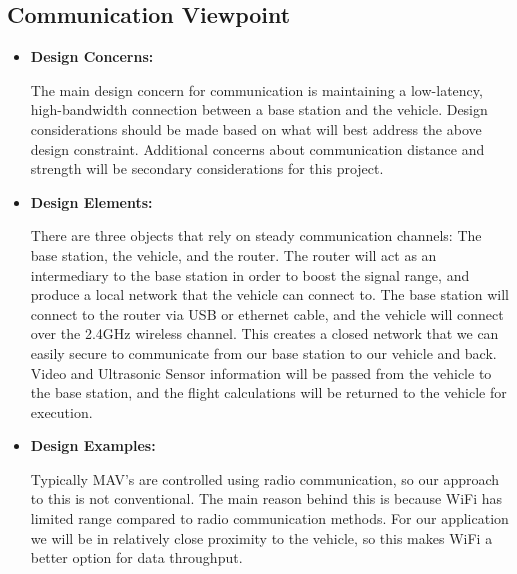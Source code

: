 \documentclass[onecolumn, draftclsnofoot,10pt, compsoc]{IEEEtran}
\begin{document}
    

\subsection{Communication Viewpoint} 
\begin{itemize}
 \item{ \textbf{Design Concerns:}}

The main design concern for communication is maintaining a low-latency, high-bandwidth connection between a base station and the vehicle. Design considerations should be made based on what will best address the above design constraint. Additional concerns about communication distance and strength will be secondary considerations for this project. \\ 

\item{ \textbf{Design Elements:}}

There are three objects that rely on steady communication channels: The base station, the vehicle, and the router. The router will act as an intermediary to the base station in order to boost the signal range, and produce a local network that the vehicle can connect to. The base station will connect to the router via USB or ethernet cable, and the vehicle will connect over the 2.4GHz wireless channel. This creates a closed network that we can easily secure to communicate from our base station to our vehicle and back. Video and Ultrasonic Sensor information will be passed from the vehicle to the base station, and the flight calculations will be returned to the vehicle for execution. \\

\item{ \textbf{Design Examples:}}

Typically MAV's are controlled using radio communication, so our approach to this is not conventional. The main reason behind this is because WiFi has limited range compared to radio communication methods. For our application we will be in relatively close proximity to the vehicle, so this makes WiFi a better option for data throughput. \\


\end{itemize}
\end{document}
